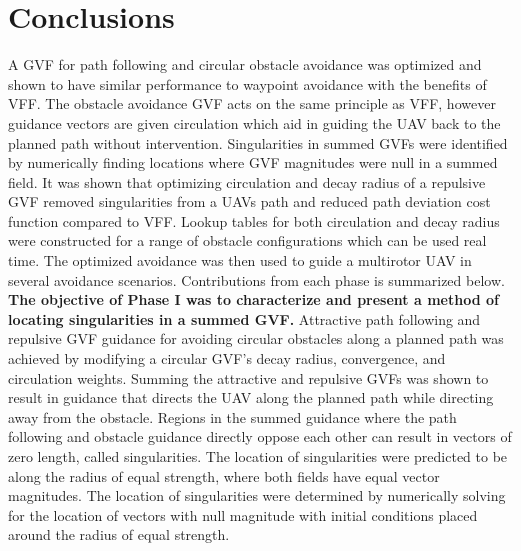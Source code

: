\documentclass[numbered,pdftex]{ohio-etd}
\begin{document}
\chapter{Conclusions}

A GVF for path following and circular obstacle avoidance was optimized and shown to have similar performance to waypoint avoidance with the benefits of VFF. The obstacle avoidance GVF acts on the same principle as VFF, however guidance vectors are given circulation which aid in guiding the UAV back to the planned path without intervention. Singularities in summed GVFs were identified by numerically finding locations where GVF magnitudes were null in a summed field. It was shown that optimizing circulation and decay radius of a repulsive GVF removed singularities from a UAVs path and reduced path deviation cost function compared to VFF. Lookup tables for both circulation and decay radius were constructed for a range of obstacle configurations which can be used real time. The optimized avoidance was then used to guide a multirotor UAV in several avoidance scenarios. Contributions from each phase is summarized below. \\

\textbf{The objective of Phase I was to characterize and present a method of locating singularities in a summed GVF.}
Attractive path following and repulsive GVF guidance for avoiding circular obstacles along a planned path was achieved by modifying a circular GVF's decay radius, convergence, and circulation weights. Summing the attractive and repulsive GVFs was shown to result in guidance that directs the UAV along the planned path while directing away from the obstacle. Regions in the summed guidance where the path following and obstacle guidance directly oppose each other can result in vectors of zero length, called singularities. The location of singularities were predicted to be along the radius of equal strength, where both fields have equal vector magnitudes. The location of singularities were determined by numerically solving for the location of vectors with null magnitude with initial conditions placed around the radius of equal strength.
\end{document}
